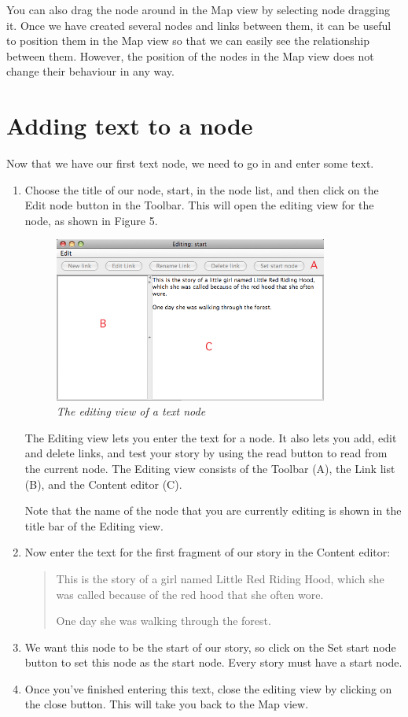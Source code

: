 \documentclass{article}
\begin{document}
You can also drag the node around in the Map view by selecting node dragging
it. Once we have created several nodes and links between them, it can be useful
to position them in the Map view so that we can easily see the relationship
between them. However, the position of the nodes in the Map view does
not change their behaviour in any way.

\section{Adding text to a node}

Now that we have our first text node, we need to go in and enter some text.

\begin{enumerate}
  \item Choose the title of our node, start, in the node list, and then click
  on the Edit node button in the Toolbar. This will open the editing view for
  the node, as shown in Figure 5. 
  
\begin{figure}[ht]
  \centering
  \includegraphics[width=9cm]{images/hypedyn-tutorial-1-figure-5}
  \caption{\textit{The editing view of a text node}}
\end{figure} 

The Editing view lets you enter the text for a node. It also lets you add, edit
and delete links, and test your story by using the read button to read from the
current node. The Editing view consists of the Toolbar (A), the Link list (B),
and the Content editor (C).

Note that the name of the node that you are currently editing is shown in the
title bar of the Editing view.

\item Now enter the text for the first fragment of our story in the Content
editor:

\begin{quotation}
This is the story of a girl named Little Red Riding Hood, which she was called
because of the red hood that she often wore.

One day she was walking through the forest.
\end{quotation}

\item We want this node to be the start of our story, so click on the Set start
node button to set this node as the start node. Every story must have a start node.
\item Once you've finished entering this text, close the editing view by
clicking on the close button. This will take you back to the Map view.
\end{enumerate}
\end{document}
